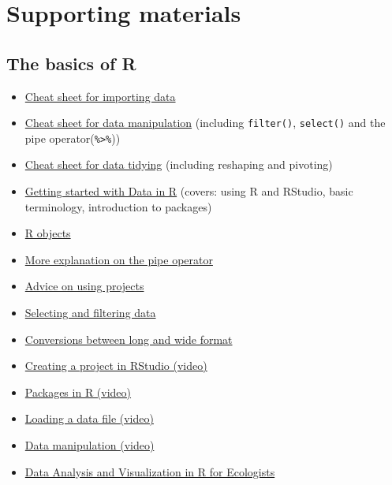 \documentclass[
]{article}
\providecommand{\tightlist}{%
  \setlength{\itemsep}{0pt}\setlength{\parskip}{0pt}}
\begin{document}
\hfill\break

\hypertarget{supporting-materials}{%
\section{Supporting materials}\label{supporting-materials}}

\hypertarget{the-basics-of-r}{%
\subsection{The basics of R}\label{the-basics-of-r}}

\begin{itemize}
\tightlist
\item
  \href{https://github.com/rstudio/cheatsheets/blob/main/data-import.pdf}{Cheat
  sheet for importing data}
\item
  \href{https://github.com/rstudio/cheatsheets/blob/main/data-transformation.pdf}{Cheat
  sheet for data manipulation} (including \texttt{filter()},
  \texttt{select()} and the pipe operator(\texttt{\%\textgreater{}\%}))
\item
  \href{https://github.com/rstudio/cheatsheets/blob/main/tidyr.pdf}{Cheat
  sheet for data tidying} (including reshaping and pivoting)
\item
  \href{https://moderndive.netlify.app/1-getting-started.html\#getting-started}{Getting
  started with Data in R} (covers: using R and RStudio, basic
  terminology, introduction to packages)
\item
  \href{https://rstudio-education.github.io/hopr/r-objects.html}{R
  objects}
\item
  \href{https://r4ds.had.co.nz/pipes.html}{More explanation on the pipe
  operator}
\item
  \href{https://r4ds.had.co.nz/workflow-projects.html}{Advice on using
  projects}
\item
  \href{https://mdsr-book.github.io/mdsr2e/ch-dataI.html\#sec:pipe}{Selecting
  and filtering data}
\item
  \href{https://mdsr-book.github.io/mdsr2e/ch-dataII.html\#data-verbs-for-converting-wide-to-narrow-and-vice-versa}{Conversions
  between long and wide format}
\item
  \href{https://www.youtube.com/watch?v=WyrJmJWgPiU}{Creating a project
  in RStudio (video)}
\item
  \href{https://www.youtube.com/watch?v=v6VygIgvoZU\&t=1s}{Packages in R
  (video)}
\item
  \href{https://www.youtube.com/watch?v=2MVolYETR5Q}{Loading a data file
  (video)}
\item
  \href{https://www.youtube.com/watch?v=Zc_ufg4uW4U}{Data manipulation
  (video)}
\item
  \href{https://datacarpentry.org/R-ecology-lesson/index.html}{Data
  Analysis and Visualization in R for Ecologists}
\end{itemize}
\end{document}
